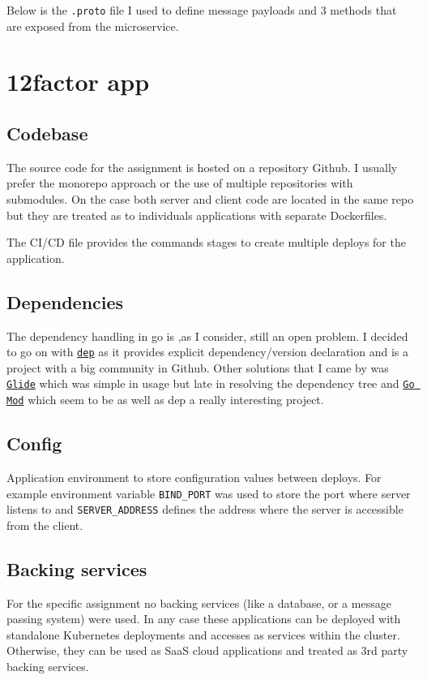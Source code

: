 \documentclass[a4paper,10pt]{article}
\begin{document}
Below is the \texttt{.proto} file I used to define message payloads and 3 methods 
that are exposed from the microservice.




\section{12factor app}

\subsection{Codebase}
The source code for the assignment is hosted on a repository Github. I usually prefer
the monorepo approach or the use of multiple repositories with submodules. On the case 
both server and client code are located in the same repo but they are treated as to 
individuals applications with separate Dockerfiles.

The CI/CD file provides the commands stages to create multiple deploys for the application.
\subsection{Dependencies}
The dependency handling in go is ,as I consider, still an open problem. I decided to 
go on with \texttt{\href{https://golang.github.io/dep/}{dep}} as it provides explicit 
dependency/version declaration and is a project with a big community in Github. Other 
solutions that I came by was \texttt{\href{https://glide.sh/}{Glide}} which was simple in 
usage but late in resolving the dependency tree and \texttt{\href{https://blog.golang.org/using-go-modules}{Go Mod}} which seem to be as well as dep a really interesting project.
\subsection{Config}
Application environment to store configuration values between deploys. For example environment variable \texttt{BIND\_PORT} was used to store the port where server listens to   and \texttt{SERVER\_ADDRESS} defines the address where the server is accessible from the client.
\subsection{Backing services}
For the specific assignment no backing services (like a database, or a message passing system) were used. In any case these applications can be deployed with standalone Kubernetes deployments and accesses as services within the cluster. Otherwise, they can
be used as SaaS cloud applications and treated as 3rd party backing services.
\end{document}
